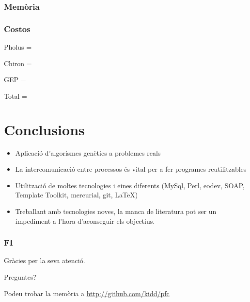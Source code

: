 \documentclass{beamer}
\begin{document}
\begin{frame}
	\frametitle{Memòria}
\end{frame}

\begin{frame}
	\frametitle{Costos}
	Pholus =  

	Chiron =  

	GEP  =  

	Total = 
\end{frame}


\section{Conclusions} %
\label{sec:Conclusions}

\begin{frame}
	\begin{itemize}
		\item Aplicació d'algorismes genètics a problemes reals
		\item La intercomunicació entre processos és vital per a fer programes reutilitzables
		\item Utilització de moltes tecnologies i eines diferents (MySql, Perl, eodev, SOAP, Template
			Toolkit, mercurial, git, LaTeX)
		\item Treballant amb tecnologies noves, la manca de literatura pot ser un impediment a
			l'hora d'aconseguir els objectius.
	\end{itemize}
\end{frame}

\begin{frame}
	\frametitle{FI}
	Gràcies per la seva atenció.

	Preguntes?

	\begin{center}
	\end{center}

	Podeu trobar la memòria a \url{http://github.com/kidd/pfc}

\end{frame}

\end{document}
